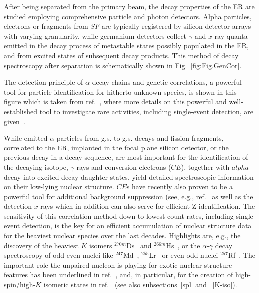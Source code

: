 After being separated from the primary beam, the decay properties of the ER are studied employing comprehensive particle and photon detectors.
Alpha particles, electrons or fragments from $SF$ are typically registered by silicon detector arrays with varying granularity, while germanium detectors collect $\gamma$ and $x$-ray quanta emitted in the decay process of metastable states possibly populated in the ER, and from excited states of subsequent decay products. 
This method of decay spectroscopy after separation is schematically shown in Fig.~\ref{fig:Fig.GenCor}. 

The detection principle of $\alpha$-decay chains and genetic correlations, a powerful tool for particle identification for hitherto unknown species, is shown in this figure which is taken from ref.~\cite{Ackermann2024}, where more details on this powerful and well-established tool to investigate rare activities, including single-event detection, are given~\cite{Hofmann2000}.

While emitted $\alpha$ particles from g.s.-to-g.s. decays and fission fragments, correlated to the ER, implanted in the focal plane silicon detector, or the previous decay in a decay sequence, are most important for the identification of the decaying isotope, $\gamma$ rays and conversion electrons ($CE$), together with $alpha$ decay into excited decay-daughter states, yield detailed spectroscopic information on their low-lying nuclear structure. 
$CE$s have recently also proven to be a powerful tool for additional background suppression (see, e.g., ref.~\cite{Bronis2022} as well as the detection $x$-rays which in addition can also serve for efficient Z-identification.
The sensitivity of this correlation method down to lowest count rates, including single event detection, is the key for an efficient accumulation of nuclear structure data for the heaviest nuclear species over the last decades.
Highlights are, e.g., the discovery of the heaviest $K$ isomers $^{270m}$Ds~\cite{Hofmann2001} and $^{266m}$Hs~\cite{Ackermann2015b}, or the $\alpha$-$\gamma$ decay spectroscopy of odd-even nuclei like $^{247}$Md~\cite{Antalic2010, Hessberger2022}, $^{255}$Lr~\cite{Chatillon2006, Antalic2008} or even-odd nuclei $^{257}$Rf~\cite{Hessberger2016, Hauschild2022}.
The important role the unpaired nucleon is playing for exotic nuclear structure features has been underlined in ref.~\cite{Ackermann2023}, and, in particular, for the creation of high-spin/high-$K$ isomeric states in ref.~\cite{Ackermann2024} (see also subsections~\ref{spl} and ~\ref{K-iso}).

